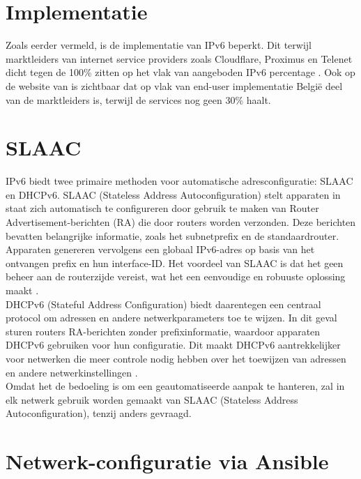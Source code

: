   \section{Implementatie}
  \label{sec:implementatie}
  
  Zoals eerder vermeld, is de implementatie van IPv6 beperkt. 
  Dit terwijl marktleiders van internet service providers zoals Cloudflare, Proximus en Telenet dicht tegen de 100\% zitten op het vlak van aangeboden IPv6 percentage \autocite{Test2024}. 
  Ook op de website van \textcite{EuropeanCommission} is zichtbaar dat op vlak van end-user implementatie België deel van de marktleiders is, terwijl de services nog geen 30\% haalt.
  
  \section{SLAAC}
  \label{sec:SLAAC}
  
  IPv6 biedt twee primaire methoden voor automatische adresconfiguratie: SLAAC en DHCPv6. 
  SLAAC (Stateless Address Autoconfiguration) stelt apparaten in staat zich automatisch te configureren door gebruik te maken van Router \\ Advertisement-berichten (RA) die door routers worden verzonden. 
  Deze berichten bevatten belangrijke informatie, zoals het subnetprefix en de standaardrouter. Apparaten genereren vervolgens een globaal IPv6-adres op basis van het ontvangen prefix en hun interface-ID. 
  Het voordeel van SLAAC is dat het geen beheer aan de routerzijde vereist, wat het een eenvoudige en robuuste oplossing maakt \autocite{Maris2024}.
  \\
  
  DHCPv6 (Stateful Address Configuration) biedt daarentegen een centraal protocol om adressen en andere netwerkparameters toe te wijzen. 
  In dit geval sturen routers RA-berichten zonder prefixinformatie, waardoor apparaten DHCPv6 gebruiken voor hun configuratie. 
  Dit maakt DHCPv6 aantrekkelijker voor netwerken die meer controle nodig hebben over het toewijzen van adressen en andere netwerkinstellingen \autocite{Maris2024}.
  \\
  
  Omdat het de bedoeling is om een geautomatiseerde aanpak te hanteren, zal in elk netwerk gebruik worden gemaakt van SLAAC (Stateless Address Autoconfiguration), tenzij anders gevraagd.
  
  \section{Netwerk-configuratie via Ansible}
  \label{sec:netconfigAnsible}
  
